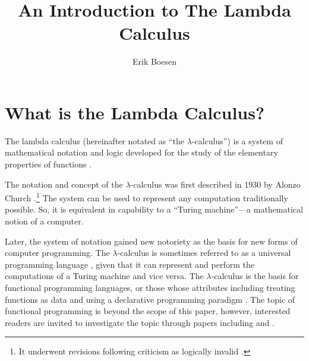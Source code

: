 \documentclass{article}
\begin{document}
\title{An Introduction to The Lambda Calculus}
\author{Erik Boesen}
\maketitle

\begin{abstract}
\end{abstract}

\section{What is the Lambda Calculus?}
The lambda calculus (hereinafter notated as ``the $\lambda$-calculus'') is a system of mathematical notation and logic developed for the study of the elementary properties of functions \cite{rojastutorial}.

The notation and concept of the $\lambda$-calculus was first described in 1930 by Alonzo Church \cite{church}.\footnote{It underwent revisions following criticism as logically invalid \cite{church2}.} The system can be used to represent any computation traditionally possible. So, it is equivalent in capability to a ``Turing machine''—a mathematical notion of a computer.

Later, the system of notation gained new notoriety as the basis for new forms of computer programming. The $\lambda$-calculus is sometimes referred to as a universal programming language \cite{rojastutorial}, given that it can represent and perform the computations of a Turing machine and vice versa. The $\lambda$-calculus is the basis for functional programming languages, or those whose attributes including treating functions as data and using a declarative programming paradigm \cite{hudakevolution}. The topic of functional programming is beyond the scope of this paper, however, interested readers are invited to investigate the topic through papers including \cite{totalfp} and \cite{hudakevolution}.
\end{document}
